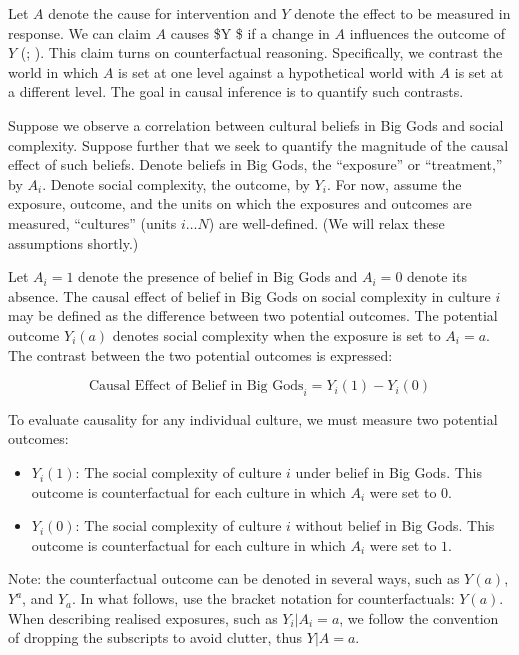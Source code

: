 \documentclass[
  singlecolumn]{article}
\providecommand{\tightlist}{%
  \setlength{\itemsep}{0pt}\setlength{\parskip}{0pt}}\usepackage{longtable,booktabs,array}
\begin{document}
Let \(A\) denote the cause for intervention and \(Y\) denote the effect
to be measured in response. We can claim \(A\) causes \$Y \$ if a change
in \(A\) influences the outcome of \(Y\) (; ). This claim turns on
counterfactual reasoning. Specifically, we contrast the world in which
\(A\) is set at one level against a hypothetical world with \(A\) is set
at a different level. The goal in causal inference is to quantify such
contrasts.

Suppose we observe a correlation between cultural beliefs in Big Gods
and social complexity. Suppose further that we seek to quantify the
magnitude of the causal effect of such beliefs. Denote beliefs in Big
Gods, the ``exposure'' or ``treatment,'' by \(A_i\). Denote social
complexity, the outcome, by \(Y_i\). For now, assume the exposure,
outcome, and the units on which the exposures and outcomes are measured,
``cultures'' (units \(i\dots N\)) are well-defined. (We will relax these
assumptions shortly.)

Let \(A_i = 1\) denote the presence of belief in Big Gods and
\(A_i = 0\) denote its absence. The causal effect of belief in Big Gods
on social complexity in culture \(i\) may be defined as the difference
between two potential outcomes. The potential outcome \(Y_i(a)\) denotes
social complexity when the exposure is set to \(A_i = a\). The contrast
between the two potential outcomes is expressed:

\[
\text{Causal Effect of Belief in Big Gods}_i = Y_i(1) - Y_i(0) 
\]

To evaluate causality for any individual culture, we must measure two
potential outcomes:

\begin{itemize}
\tightlist
\item
  \(Y_i(1)\): The social complexity of culture \(i\) under belief in Big
  Gods. This outcome is counterfactual for each culture in which \(A_i\)
  were set to \(0\).
\item
  \(Y_i(0)\): The social complexity of culture \(i\) without belief in
  Big Gods. This outcome is counterfactual for each culture in which
  \(A_i\) were set to \(1\).
\end{itemize}

Note: the counterfactual outcome can be denoted in several ways, such as
\(Y(a)\), \(Y^{a}\), and \(Y_a\). In what follows, use the bracket
notation for counterfactuals: \(Y(a)\). When describing realised
exposures, such as \(Y_i|A_i = a\), we follow the convention of dropping
the subscripts to avoid clutter, thus \(Y|A = a\).
\end{document}
